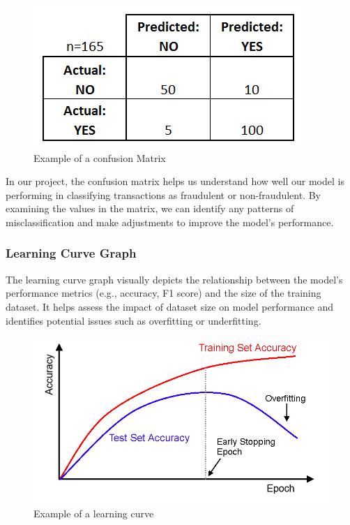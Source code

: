 \documentclass[conference]{IEEEtran}
\begin{document}
\begin{figure}[H]
    \centering
    \includegraphics[width=1\linewidth]{images/confusionMatrixExample.png}
    \caption{Example of a confusion Matrix}
    \label{fig:enter-label}
\end{figure}

In our project, the confusion matrix helps us understand how well our model is performing in classifying transactions as fraudulent or non-fraudulent. By examining the values in the matrix, we can identify any patterns of misclassification and make adjustments to improve the model's performance.

\subsubsection{Learning Curve Graph}

The learning curve graph visually depicts the relationship between the model's performance metrics (e.g., accuracy, F1 score) and the size of the training dataset. It helps assess the impact of dataset size on model performance and identifies potential issues such as overfitting or underfitting.

\begin{figure}[H]
    \centering
    \includegraphics[width=1\linewidth]{images/learningCurveExample.png}
    \caption{Example of a learning curve}
    \label{fig:enter-label}
\end{figure}
\end{document}
